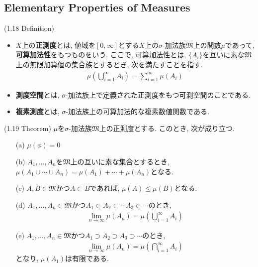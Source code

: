 \documentclass[a4paper]{jsarticle}
\begin{document}
\subsection{Elementary Properties of Measures}
\begin{defi}{(1.18 Definition)}{}
    \begin{itemize}
        \item $X$上の{\bf 正測度}とは, 値域を$[0, \infty]$とする$X$上の$\sigma$-加法族$\mathfrak{M}$上の関数$\mu$であって, {\bf 可算加法性}をもつものをいう. ここで, 可算加法性とは, $\{A_i\}$を互いに素な$\mathfrak{M}$上の無限加算個の集合族とするとき, 次を満たすことを指す.
        \begin{align*}
            \mu\left( \bigcup_{i=1}^\infty A_i \right) = \sum_{i=1}^\infty \mu(A_i)
        \end{align*}
        \item {\bf 測度空間}とは, $\sigma$-加法族上で定義された正測度をもつ可測空間のことである.
        \item {\bf 複素測度}とは, $\sigma$-加法族上の可算加法的な複素数値関数である.
    \end{itemize}
\end{defi}
\begin{thm}{(1.19 Theorem)}{}
    $\mu$を$\sigma$-加法族$\mathfrak{M}$上の正測度とする. このとき, 次が成り立つ.
    \begin{enumerate}
        \item[(a)] $\mu(\phi) = 0$
        \item[(b)] $A_1, \dots, A_n$を$\mathfrak{M}$上の互いに素な集合とするとき, $\mu(A_1\cup \cdots \cup A_n) = \mu(A_1) + \cdots +\mu(A_n)$となる.
        \item[(c)] $A, B\in \mathfrak{M}$かつ$A\subset B$であれば, $\mu(A)\leq \mu(B)$となる.
        \item[(d)] $A_1, \dots, A_n\in \mathfrak{M}$かつ$A_1\subset A_2\subset \cdots A_3\subset \cdots$のとき,
        \begin{align*}
            \lim_{n\to \infty} \mu(A_n) = \mu\left( \bigcup_{i=1}^\infty A_i \right)
        \end{align*}
        \item[(e)] $A_1, \dots, A_n\in \mathfrak{M}$かつ$A_1\supset A_2\supset A_3\supset\cdots$のとき,
        \begin{align*}
            \lim_{n\to \infty} \mu(A_n) = \mu\left( \bigcap_{i=1}^\infty A_i \right)
        \end{align*}
        となり, $\mu(A_1)$は有限である.
    \end{enumerate}
\end{thm}
\end{document}
